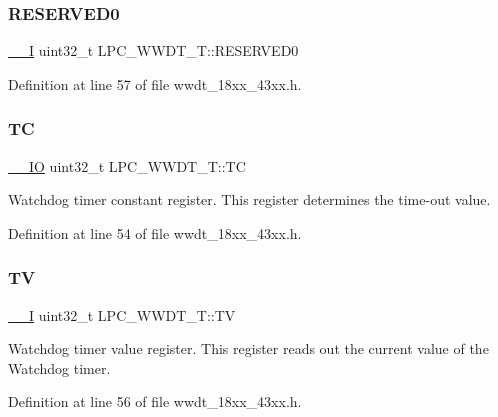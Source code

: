 \subsubsection{\texorpdfstring{R\+E\+S\+E\+R\+V\+E\+D0}{RESERVED0}}
{\footnotesize\ttfamily \hyperlink{core__sc300_8h_af63697ed9952cc71e1225efe205f6cd3}{\+\_\+\+\_\+I} uint32\+\_\+t L\+P\+C\+\_\+\+W\+W\+D\+T\+\_\+\+T\+::\+R\+E\+S\+E\+R\+V\+E\+D0}



Definition at line 57 of file wwdt\+\_\+18xx\+\_\+43xx.\+h.

\mbox{\label{struct_l_p_c___w_w_d_t___t_a8390ac91aea3330b363ad2fd5dc97f98}} 
\subsubsection{\texorpdfstring{TC}{TC}}
{\footnotesize\ttfamily \hyperlink{core__sc300_8h_aec43007d9998a0a0e01faede4133d6be}{\+\_\+\+\_\+\+IO} uint32\+\_\+t L\+P\+C\+\_\+\+W\+W\+D\+T\+\_\+\+T\+::\+TC}

Watchdog timer constant register. This register determines the time-\/out value. 

Definition at line 54 of file wwdt\+\_\+18xx\+\_\+43xx.\+h.

\mbox{\label{struct_l_p_c___w_w_d_t___t_a8257032e074282d5242e1d2a07537db1}} 
\subsubsection{\texorpdfstring{TV}{TV}}
{\footnotesize\ttfamily \hyperlink{core__sc300_8h_af63697ed9952cc71e1225efe205f6cd3}{\+\_\+\+\_\+I} uint32\+\_\+t L\+P\+C\+\_\+\+W\+W\+D\+T\+\_\+\+T\+::\+TV}

Watchdog timer value register. This register reads out the current value of the Watchdog timer. 

Definition at line 56 of file wwdt\+\_\+18xx\+\_\+43xx.\+h.

\mbox{\label{struct_l_p_c___w_w_d_t___t_a6efaed3716fc4661ef3a7a52bcc9028a}} 
